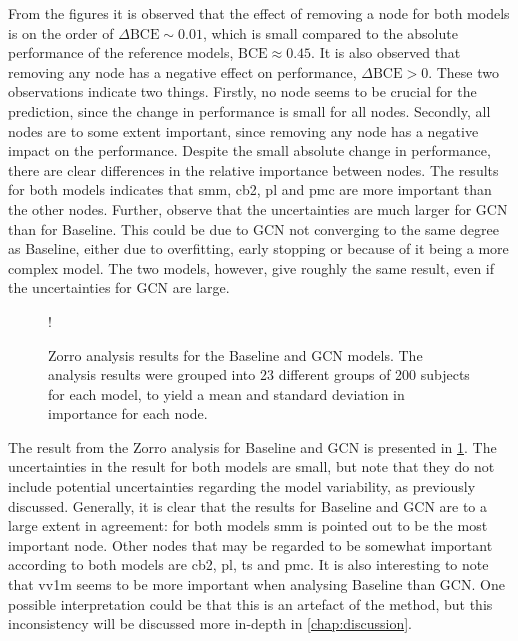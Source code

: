 From the figures it is observed that the effect of removing a node for both models is on the order of $\Delta \text{BCE} \sim 0.01$, which is small compared to the absolute performance of the reference models, $\text{BCE} \approx 0.45$. It is also observed that removing any node has a negative effect on performance, $\Delta\text{BCE}>0$. These two observations indicate two things. Firstly, no node seems to be crucial for the prediction, since the change in performance is small for all nodes. Secondly, all nodes are to some extent important, since removing any node has a negative impact on the performance. Despite the small absolute change in performance, there are clear differences in the relative importance between nodes. The results for both models indicates that \acrshort{smm}, \acrshort{cb2}, \acrshort{pl} and \acrshort{pmc} are more important than the other nodes. Further, observe that the uncertainties are much larger for GCN than for Baseline. This could be due to GCN not converging to the same degree as Baseline, either due to overfitting, early stopping or because of it being a more complex model. The two models, however, give roughly the same result, even if the uncertainties for GCN are large. 

\begin{figure}[!htbp]
    \centering
    \begin{center}
        \resizebox {0.7\linewidth} {!} {
            
        }
    \end{center}
    \caption{Zorro analysis results for the Baseline and GCN models. The analysis results were grouped into 23 different groups of 200 subjects for each model, to yield a mean and standard deviation in importance for each node.}
    \label{fig:zorro_sex}
\end{figure}

The result from the Zorro analysis for Baseline and GCN is presented in \cref{fig:zorro_sex}. The uncertainties in the result for both models are small, but note that they do not include potential uncertainties regarding the model variability, as previously discussed. Generally, it is clear that the results for Baseline and GCN are to a large extent in agreement: for both models \acrshort{smm} is pointed out to be the most important node. Other nodes that may be regarded to be somewhat important according to both models are \acrshort{cb2}, \acrshort{pl}, \acrshort{ts} and \acrshort{pmc}. It is also interesting to note that \acrshort{vv1m} seems to be more important when analysing Baseline than GCN. One possible interpretation could be that this is an artefact of the method, but this inconsistency will be discussed more in-depth in \cref{chap:discussion}.

